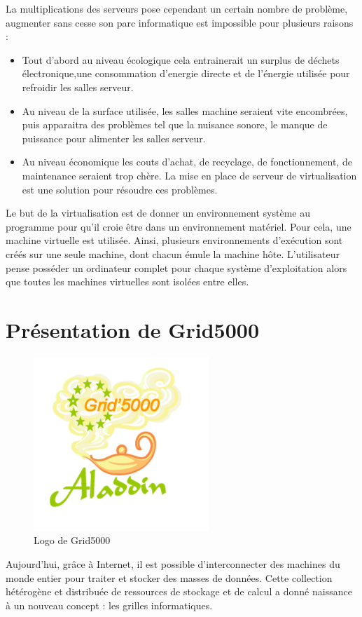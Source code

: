 La multiplications des serveurs pose cependant un certain nombre
de problème, augmenter sans cesse son parc informatique est impossible
pour plusieurs raisons : 
\begin{itemize}
\item Tout d'abord au niveau écologique cela entrainerait un surplus de déchets électronique,une consommation d'energie directe et de l'énergie utilisée pour refroidir les salles serveur.
\item Au niveau de la surface utilisée, les salles machine seraient vite encombrées, puis apparaitra des problèmes tel que la nuisance sonore, le manque de puissance pour alimenter les salles serveur. 
\item Au niveau économique les couts d'achat, de recyclage, de fonctionnement, de maintenance seraient trop chère. La mise en place de serveur de virtualisation est une solution pour résoudre ces problèmes.
\end{itemize}

Le but de la virtualisation est de donner un environnement système
au programme pour qu'il croie être dans un environnement
matériel. Pour cela, une machine virtuelle est utilisée. Ainsi, plusieurs
environnements d'exécution sont créés sur une seule
machine, dont chacun émule la machine hôte. L'utilisateur
pense posséder un ordinateur complet pour chaque système d'exploitation
alors que toutes les machines virtuelles sont isolées entre elles.


\newpage

\section{Présentation de Grid5000}
\begin{figure}
\begin{center}
\includegraphics{images/logo.png}
\caption{Logo de Grid5000}
\end{center}

\end{figure}
Aujourd’hui, grâce à Internet, il est possible
d’interconnecter des machines du monde entier pour
traiter et stocker des masses de données. Cette collection
hétérogène et distribuée de ressources de stockage et de
calcul a donné naissance à un nouveau concept : les
grilles informatiques.

